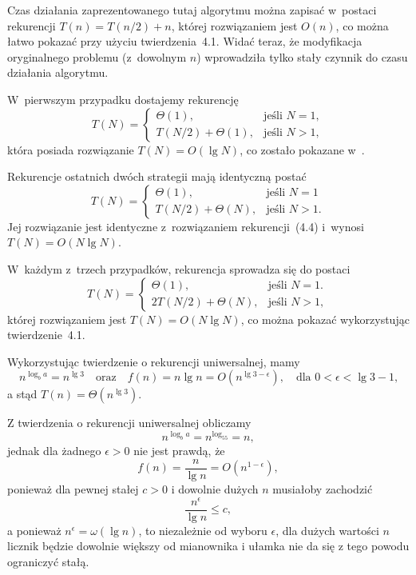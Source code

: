 Czas działania zaprezentowanego tutaj algorytmu można zapisać w~postaci rekurencji $T(n)=T(n/2)+n$, której rozwiązaniem jest $O(n)$, co można łatwo pokazać przy użyciu twierdzenia~4.1. Widać teraz, że modyfikacja oryginalnego problemu (z~dowolnym $n$) wprowadziła tylko stały czynnik do czasu działania algorytmu.


\subproblem %
W~pierwszym przypadku dostajemy rekurencję
\[
	T(N) = \begin{cases}
		\Theta(1), & \text{jeśli $N=1$}, \\
		T(N/2)+\Theta(1), & \text{jeśli $N>1$},
	\end{cases}
\]
która posiada rozwiązanie $T(N)=O(\lg N)$, co zostało pokazane w~.

\medskip
\noindent Rekurencje ostatnich dwóch strategii mają identyczną postać
\[
	T(N) = \begin{cases}
		\Theta(1), & \text{jeśli $N=1$} \\
		T(N/2)+\Theta(N), & \text{jeśli $N>1$}.
	\end{cases}
\]
Jej rozwiązanie jest identyczne z~rozwiązaniem rekurencji~(4.4) i~wynosi $T(N)=O(N\lg N)$.

\subproblem %
W~każdym z~trzech przypadków, rekurencja sprowadza się do postaci
\[
	T(N) = \begin{cases}
		\Theta(1), & \text{jeśli $N=1$}. \\
		2T(N/2)+\Theta(N), & \text{jeśli $N>1$},
	\end{cases}
\]
której rozwiązaniem jest $T(N)=O(N\lg N)$, co można pokazać wykorzystując twierdzenie~4.1.


\subproblem %
Wykorzystując twierdzenie o rekurencji uniwersalnej, mamy
\[
	n^{\log_ba} = n^{\lg3} \quad\text{oraz}\quad f(n) = n\lg n = O(n^{\lg3-\epsilon}), \quad\text{dla $0<\epsilon<\lg3-1$,}
\]
a stąd $T(n)=\Theta(n^{\lg3})$.

\subproblem %
Z twierdzenia o rekurencji uniwersalnej obliczamy
\[
	n^{\log_ba} = n^{\log_55} = n,
\]
jednak dla żadnego $\epsilon>0$ nie jest prawdą, że
\[
	f(n) = \frac{n}{\lg n} = O(n^{1-\epsilon}),
\]
ponieważ dla pewnej stałej $c>0$ i dowolnie dużych $n$ musiałoby zachodzić
\[
	\frac{n^\epsilon}{\lg n} \le c,
\]
a ponieważ $n^\epsilon=\omega(\lg n)$, to niezależnie od wyboru $\epsilon$, dla dużych wartości $n$ licznik będzie dowolnie większy od mianownika i ułamka nie da się z tego powodu ograniczyć stałą.

